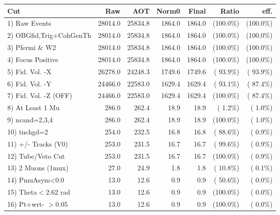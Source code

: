  \begin{table}[h!]\centering
 \begin{tabular}{||l||r|r|r|r|r|r||}
 \hline
 \hline
 Cut & Raw & AOT & Norm0 & Final & Ratio & eff.       \\
 \hline
  1) Raw Events           &      28014.0 &      25834.8 &       1864.0 &       1864.0 & (100.0\%) & (100.0\%) \\
  2) OBGfid,Trig+CohGenTh &      28014.0 &      25834.8 &       1864.0 &       1864.0 & (100.0\%) & (100.0\%) \\
  3) Pfermi \& W2         &      28014.0 &      25834.8 &       1864.0 &       1864.0 & (100.0\%) & (100.0\%) \\
  4) Focus Positive       &      28014.0 &      25834.8 &       1864.0 &       1864.0 & (100.0\%) & (100.0\%) \\
  5) Fid. Vol. -X         &      26278.0 &      24248.3 &       1749.6 &       1749.6 & ( 93.9\%) & ( 93.9\%) \\
  6) Fid. Vol. -Y         &      24466.0 &      22583.0 &       1629.4 &       1629.4 & ( 93.1\%) & ( 87.4\%) \\
  7) Fid. Vol. -Z (OFF)   &      24466.0 &      22583.0 &       1629.4 &       1629.4 & (100.0\%) & ( 87.4\%) \\
  8) At Least 1 Mu        &        286.0 &        262.4 &         18.9 &         18.9 & (  1.2\%) & (  1.0\%) \\
  9) ncand=2,3,4          &        286.0 &        262.4 &         18.9 &         18.9 & (100.0\%) & (  1.0\%) \\
 10) tnchgd=2             &        254.0 &        232.5 &         16.8 &         16.8 & ( 88.6\%) & (  0.9\%) \\
 11) +/- Tracks (V0)      &        253.0 &        231.5 &         16.7 &         16.7 & ( 99.6\%) & (  0.9\%) \\
 12) Tube/Veto Cut        &        253.0 &        231.5 &         16.7 &         16.7 & (100.0\%) & (  0.9\%) \\
 13) 2 Muons (1mux)       &         27.0 &         24.9 &          1.8 &          1.8 & ( 10.8\%) & (  0.1\%) \\
 14) PmuAsym<0.0          &         13.0 &         12.6 &          0.9 &          0.9 & ( 50.6\%) & (  0.0\%) \\
 15) Theta$<$2.62 rad     &         13.0 &         12.6 &          0.9 &          0.9 & (100.0\%) & (  0.0\%) \\
 16) Pt+wrt- $>$0.05      &         13.0 &         12.6 &          0.9 &          0.9 & (100.0\%) & (  0.0\%) \\

\end{tabular}
\end{table}
